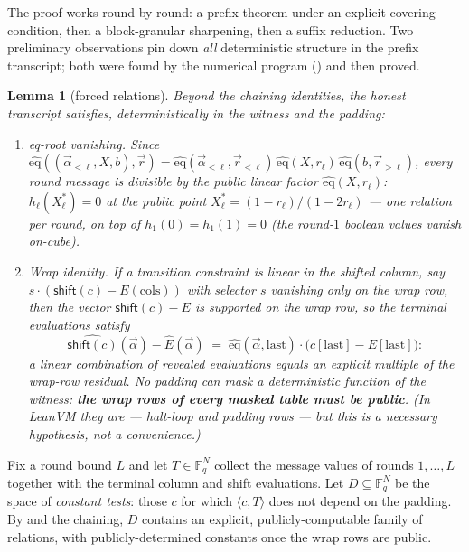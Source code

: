 \documentclass{article}
\newcommand{\Fq}{\mathbb{F}_q}
\newcommand{\eqf}{\widehat{\mathrm{eq}}}
\newtheorem{lemma}[theorem]{Lemma}
\theoremstyle{definition}
\begin{document}
The proof works round by round: a prefix theorem under an explicit covering condition, then a block-granular sharpening, then a suffix reduction. Two preliminary observations pin down \emph{all} deterministic structure in the prefix transcript; both were found by the numerical program () and then proved.

\begin{lemma}[forced relations]\label{lem:forced}
Beyond the chaining identities, the honest transcript satisfies, deterministically in the witness and the padding:
\begin{enumerate}
    \item \emph{eq-root vanishing.} Since $\eqf((\vec\alpha_{<\ell}, X, b), \vec r) = \eqf(\vec\alpha_{<\ell}, \vec r_{<\ell})\, \eqf(X, r_\ell)\, \eqf(b, \vec r_{>\ell})$, every round message is divisible by the public linear factor $\eqf(X, r_\ell)$: $h_\ell(X^*_\ell) = 0$ at the public point $X^*_\ell = (1 - r_\ell)/(1 - 2 r_\ell)$ --- one relation per round, on top of $h_1(0) = h_1(1) = 0$ (the round-$1$ boolean values vanish on-cube).
    \item \emph{Wrap identity.} If a transition constraint is linear in the shifted column, say $s \cdot (\mathsf{shift}(c) - E(\mathrm{cols}))$ with selector $s$ vanishing only on the wrap row, then the \emph{vector} $\mathsf{shift}(c) - E$ is supported on the wrap row, so the terminal evaluations satisfy
    \[
    \widehat{\mathsf{shift}(c)}(\vec\alpha) - \widehat{E}(\vec\alpha) \;=\; \eqf(\vec\alpha, \mathrm{last}) \cdot \big(c[\mathrm{last}] - E[\mathrm{last}]\big) :
    \]
    a linear combination of revealed evaluations equals an explicit multiple of the \emph{wrap-row residual}. No padding can mask a deterministic function of the witness: \textbf{the wrap rows of every masked table must be public}. (In LeanVM they are --- halt-loop and padding rows --- but this is a necessary hypothesis, not a convenience.)
\end{enumerate}
\end{lemma}

Fix a round bound $L$ and let $T \in \Fq^N$ collect the message values of rounds $1, \dots, L$ together with the terminal column and shift evaluations. Let $D \subseteq \Fq^N$ be the space of \emph{constant tests}: those $c$ for which $\langle c, T \rangle$ does not depend on the padding. By  and the chaining, $D$ contains an explicit, publicly-computable family of relations, with publicly-determined constants once the wrap rows are public.
\end{document}
